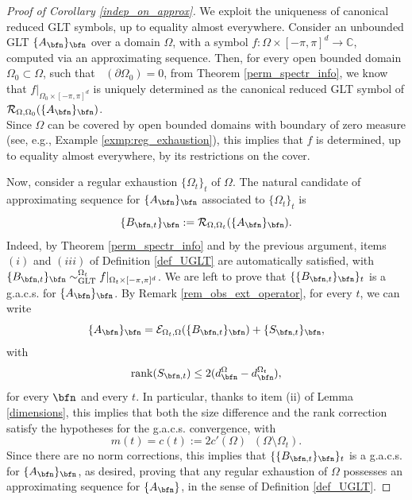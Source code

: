 \documentclass{amsart}
\DeclareMathOperator{\Ld}{\mathcal{L}^d}
\begin{document}
\begin{proof}[Proof of Corollary \ref{indep_on_approx}]
    We exploit the uniqueness of canonical reduced GLT symbols, up to equality almost everywhere. 
    Consider an unbounded GLT $\{A_\bfn\}_\bfn$ over a domain $\Omega$, with a symbol $f:\Omega\times[-\pi,\pi]^d\to\mathbb{C}$, computed via an approximating sequence. Then, for every open bounded domain $\Omega_0\subset\Omega$, such that $\Ld(\partial\Omega_0)=0$, from Theorem \ref{perm_spectr_info}, we know that $f|_{\Omega_0\times[-\pi,\pi]^d}$ is uniquely determined as the canonical reduced GLT symbol of $\mathcal{R}_{\Omega,\Omega_0}(\{A_\bfn\}_\bfn)$.\\ Since $\Omega$ can be covered by open bounded domains with boundary of zero measure (see, e.g., Example \ref{exmp:reg_exhaustion}), this implies that $f$ is determined, up to equality almost everywhere, by its restrictions on the cover.

    Now, consider a regular exhaustion $\{\Omega_t\}_t$ of $\Omega$. The natural candidate of approximating sequence for $\{A_\bfn\}_\bfn$ associated to $\{\Omega_t\}_t$ is 
    \begin{equation*}
        \{B_{\bfn,t}\}_\bfn:=\mathcal{R}_{\Omega,\Omega_t}(\{A_\bfn\}_\bfn).
    \end{equation*}
    Indeed, by Theorem \ref{perm_spectr_info} and by the previous argument, items $(i)$ and $(iii)$ of Definition \ref{def_UGLT} are automatically satisfied, with
    $\{B_{\bfn,t}\}_\bfn\sim_{\mathrm{GLT}}^{\Omega_t}f|_{\Omega_t\times[-\pi,\pi]^d}$. We are left to prove that $\{\{B_{\bfn,t}\}_\bfn\}_t$ is a g.a.c.s. for $\{A_\bfn\}_\bfn$.
    By Remark \ref{rem_obs_ext_operator}, for every $t$, we can write
    \begin{equation*}
        \{A_\bfn\}_\bfn=\mathcal{E}_{\Omega_t,\Omega}(\{B_{\bfn,t}\}_\bfn)+\{S_{\bfn,t}\}_{\bfn},
    \end{equation*}
    with 
    \begin{equation*}
        \mathrm{rank}(S_{\bfn,t})\leq 2(d_{\bfn}^{\Omega}-d_\bfn^{\Omega_t}),
    \end{equation*}
    for every $\bfn$ and every $t$. In particular, thanks to item (ii) of Lemma \ref{dimensions}, this implies that both the size difference and the rank correction satisfy the hypotheses for the g.a.c.s. convergence, with 
    \begin{equation*}
        m(t)=c(t):=2c'(\Omega)\Ld(\Omega\setminus\Omega_t).
    \end{equation*}
    Since there are no norm corrections, this implies that $\{\{B_{\bfn,t}\}_\bfn\}_t$ is a g.a.c.s. for $\{A_\bfn\}_\bfn$, as desired, proving that any regular exhaustion of $\Omega$ possesses an approximating sequence for $\{A_\bfn\}$, in the sense of Definition \ref{def_UGLT}.
\end{proof}
\end{document}
